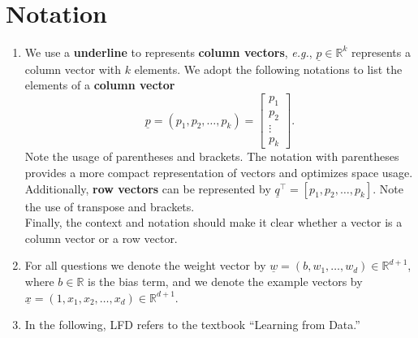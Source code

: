 \documentclass{article}
\title{\vspace{-2.5cm}\textbf{\coursefullname}\\\hatypeandnun\\\haname}
\date{}
\newcommand{\setR}{\mathbb{R}}
\newcommand{\setRdone}{\mathbb{R}^{d+1}}
\renewcommand{\vec}[1]{\underline{#1}}
\newcommand{\vecw}{\vec{w}}
\newcommand{\vecx}{\vec{x}}
\theoremstyle{definition}
\begin{document}
\maketitle
\vspace*{-2cm}
\section*{Notation}
\begin{enumerate}[label=(\alph*)]
	\item We use a \textbf{underline} to represents \textbf{column vectors}, \textit{e.g.}, $\vec{p} \in \setR^{k}$ represents a column vector with $k$ elements. We adopt the following notations to list the elements of a \textbf{column vector} $$\vec{p} = (p_1, p_2, \ldots, p_k)=\begin{bmatrix}
		p_1\\
		p_2\\
		\vdots\\
		p_k
	\end{bmatrix}.$$ Note the usage of parentheses and brackets. The notation with parentheses provides a more compact representation of vectors and optimizes space usage.\\
	Additionally, \textbf{row vectors} can be represented by $\vec{q}^\top = \left[p_1, p_2, \ldots, p_k\right]$. Note the use of transpose and brackets.\\ Finally, the context and notation should make it clear whether a vector is a column vector or a row vector.
	\item For all questions we denote the weight vector by $\vecw=(b, w_1, \ldots, w_d) \in \setRdone$, where $b \in \mathbb{R}$ is the bias term, and we denote the example vectors by $\vecx=(1, x_1, x_2, \ldots, x_d) \in \setRdone.$
	\item In the following, LFD refers to the textbook ``Learning from Data.''
\end{enumerate}
 
\end{document}
